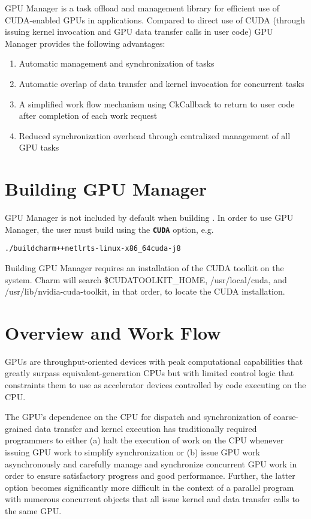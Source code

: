 \setcounter{secnumdepth}{3}

\renewcommand{\code}[1]{\texttt{\textbf{#1}}}

\newcommand{\cuda}{\code{CUDA}}

GPU Manager is a task offload and management library for efficient use of
CUDA-enabled GPUs in \charmpp{} applications. Compared to direct use of CUDA
(through issuing kernel invocation and GPU data transfer calls in user
code) GPU Manager provides the following advantages:
\begin{enumerate}
\item Automatic management and synchronization of tasks
\item Automatic overlap of data transfer and kernel invocation for concurrent tasks
\item A simplified work flow mechanism using CkCallback to return to user code after completion of each work request
\item Reduced synchronization overhead through centralized management of all GPU tasks
\end{enumerate}

\section{Building GPU Manager}

GPU Manager is not included by default when building \charmpp{}. In order to use
GPU Manager, the user must build \charmpp{} using the \cuda{} option, e.g.

\begin{alltt}
./build charm++ netlrts-linux-x86_64 cuda -j8
\end{alltt}
Building GPU Manager requires an installation of the CUDA toolkit on the system.
Charm will search \$CUDATOOLKIT\_HOME, /usr/local/cuda, and
/usr/lib/nvidia-cuda-toolkit, in that order, to locate the CUDA installation.

\section{Overview and Work Flow}

GPUs are throughput-oriented devices with peak computational capabilities that
greatly surpass equivalent-generation CPUs but with limited control logic that
constraints them to use as accelerator devices controlled by code executing on
the CPU.

The GPU's dependence on the CPU for dispatch and synchronization of
coarse-grained data transfer and kernel execution has traditionally required
programmers to either (a) halt the execution of work on the CPU whenever issuing
GPU work to simplify synchronization or (b) issue GPU work asynchronously and
carefully manage and synchronize concurrent GPU work in order to ensure
satisfactory progress and good performance. Further, the latter option becomes
significantly more difficult in the context of a parallel program with numerous
concurrent objects that all issue kernel and data transfer calls to the same GPU.

